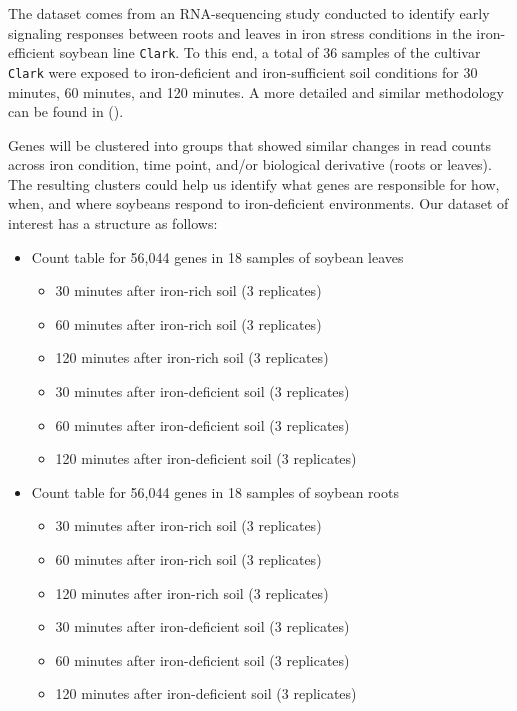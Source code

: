 \documentclass[11pt,a4paper,oldfontcommands,openany]{memoir}
\numberwithin{equation}{section} %
\newcommand{\code}[1]{{\texttt{#1}}}
\begin{document}
The dataset comes from an RNA-sequencing study conducted to identify early signaling responses between roots and leaves in iron stress conditions in the iron-efficient soybean line \code{Clark}. To this end, a total of 36 samples of the cultivar \code{Clark} were exposed to iron-deficient and iron-sufficient soil conditions for 30 minutes, 60 minutes, and 120 minutes. A more detailed and similar methodology can be found in (\citealt{adSoy}).

Genes will be clustered into groups that showed similar changes in read counts across iron condition, time point, and/or biological derivative (roots or leaves). The resulting clusters could help us identify what genes are responsible for how, when, and where soybeans respond to iron-deficient environments. Our dataset of interest has a structure as follows:

\begin{itemize}
  \item Count table for 56,044 genes in 18 samples of soybean leaves
  \begin{itemize}
    \item 30 minutes after iron-rich soil (3 replicates)
    \item 60 minutes after iron-rich soil (3 replicates)
    \item 120 minutes after iron-rich soil (3 replicates)
    \item 30 minutes after iron-deficient soil (3 replicates)
    \item 60 minutes after iron-deficient soil (3 replicates)
    \item 120 minutes after iron-deficient soil (3 replicates)
  \end{itemize}
  \item Count table for 56,044 genes in 18 samples of soybean roots
    \begin{itemize}
    \item 30 minutes after iron-rich soil (3 replicates)
    \item 60 minutes after iron-rich soil (3 replicates)
    \item 120 minutes after iron-rich soil (3 replicates)
    \item 30 minutes after iron-deficient soil (3 replicates)
    \item 60 minutes after iron-deficient soil (3 replicates)
    \item 120 minutes after iron-deficient soil (3 replicates)
  \end{itemize}
\end{itemize}
\end{document}
